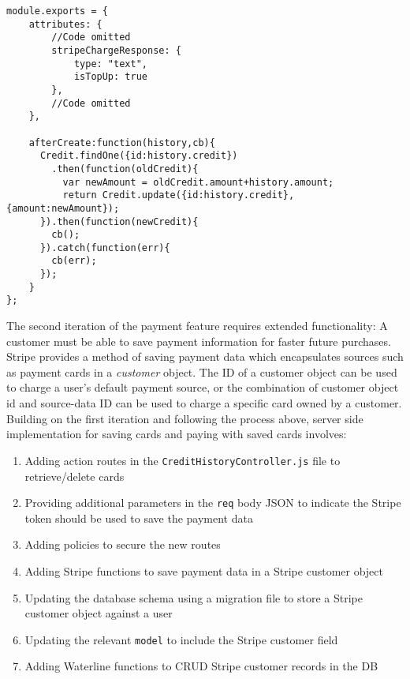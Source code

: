 \begin{lstlisting}[caption=CreditHistory.js model file, label={lst:credit-history-model}]
module.exports = {
    attributes: {
		//Code omitted
        stripeChargeResponse: {
            type: "text",
            isTopUp: true
        },
		//Code omitted
    },

    afterCreate:function(history,cb){
      Credit.findOne({id:history.credit})
        .then(function(oldCredit){
          var newAmount = oldCredit.amount+history.amount;
          return Credit.update({id:history.credit},{amount:newAmount});
      }).then(function(newCredit){
        cb();
      }).catch(function(err){
        cb(err);
      });
    }
};

\end{lstlisting}

The second iteration of the payment feature requires extended functionality: A customer must be able to save payment information for faster future purchases. Stripe provides a method of saving payment data which encapsulates sources such as payment cards in a \textit{customer} object. The ID of a customer object can be used to charge a user's default payment source, or the combination of customer object id and source-data ID can be used to charge a specific card owned by a customer. Building on the first iteration and following the process above, server side implementation for saving cards and paying with saved cards involves:

\begin{enumerate}
	\item Adding action routes in the \texttt{CreditHistoryController.js} file to retrieve/delete cards
    \item Providing additional parameters in the \texttt{req} body JSON to indicate the Stripe token should be used to save the payment data
    \item Adding policies to secure the new routes
    \item Adding Stripe functions to save payment data in a Stripe customer object
    \item Updating the database schema using a migration file to store a Stripe customer object against a user
    \item Updating the relevant \texttt{model} to include the Stripe customer field
    \item Adding Waterline functions to CRUD Stripe customer records in the DB
\end{enumerate}


